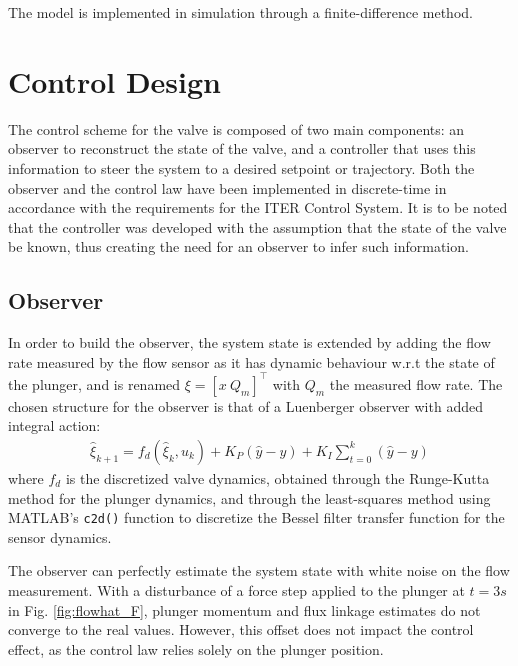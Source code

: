 \documentclass[letterpaper, 10pt, conference]{ieeeconf}
\begin{document}
The model is implemented in simulation through a finite-difference method.

\section{Control Design}\label{sec:ctrl}
The control scheme for the valve is composed of two main components: an observer to reconstruct the state of the valve, and a controller that uses this information to steer the system to a desired setpoint or trajectory. Both the observer and the control law have been implemented in discrete-time in accordance with the requirements for the ITER Control System. It is to be noted that the controller was developed with the assumption that the state of the valve be known, thus creating the need for an observer to infer such information.

\subsection{Observer}
In order to build the observer, the system state is extended by adding the flow rate measured by the flow sensor as it has dynamic behaviour w.r.t the state of the plunger, and is renamed $\xi = [x \ Q_m]^\top$ with $Q_m$ the measured flow rate.
The chosen structure for the observer is that of a Luenberger observer with added integral action:
\begin{align}
    \hat{\xi}_{k+1} = f_d(\hat{\xi}_k, u_k) + K_P(\hat{y}-y) + K_I \displaystyle\sum_{t=0}^{k}(\hat{y}-y)
\end{align}
where $f_d$ is the discretized valve dynamics, obtained through the Runge-Kutta method for the plunger dynamics, and through the least-squares method using MATLAB's \verb|c2d()| function to discretize the Bessel filter transfer function for the sensor dynamics. 

The observer can perfectly estimate the system state with white noise on the flow measurement. With a disturbance of a force step applied to the plunger at $t=3s$ in Fig. \ref{fig:flowhat_F}, plunger momentum and flux linkage estimates do not converge to the real values. However, this offset does not impact the control effect, as the control law relies solely on the plunger position.
\end{document}
